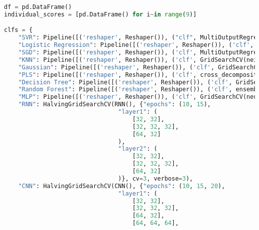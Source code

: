 \begin{lstlisting}[label=python-listing,caption={Kod źródłowy},language=python]
df = pd.DataFrame()
individual_scores = [pd.DataFrame() for i~in range(9)]

clfs = {
    "SVR": Pipeline([('reshaper', Reshaper()), ("clf", MultiOutputRegressor(GridSearchCV(svm.SVR(), {"kernel": ('linear', 'poly', 'rbf', 'sigmoid'), "C": (0.1, 1., 10), "epsilon": (0.01, 0.1, 1)})))]),
    "Logistic Regression": Pipeline([('reshaper', Reshaper()), ('clf', MultiOutputRegressor(GridSearchCV(linear_model.Ridge(), {"solver": ('svd', 'cholesky', 'lsqr', 'sparse_cg', 'sag', 'saga', 'lbfgs')})))]),
    "SGD": Pipeline([('reshaper', Reshaper()), ('clf', MultiOutputRegressor(GridSearchCV(linear_model.SGDRegressor(), {"penalty": ('l2', 'l1', 'elasticnet'), "loss": ('squared_error', 'huber', 'epsilon_insensitive', 'squared_epsilon_insensitive')})))]),
    "KNN": Pipeline([('reshaper', Reshaper()), ('clf', GridSearchCV(neighbors.KNeighborsRegressor(), {"weights": ("unifor", "distance"), "algorithm": ('ball_tree', 'kd_tree', 'brute'), "p": (1, 2, 3, 4)}))]),
    "Gaussian": Pipeline([('reshaper', Reshaper()), ('clf', GridSearchCV(gaussian_process.GaussianProcessRegressor(normalize_y=True), {"alpha": (1e-10, 1e-5, .01, .1), "n_restarts_optimizer": (0, 1, 2, 3, 4)}))]),
    "PLS": Pipeline([('reshaper', Reshaper()), ('clf', cross_decomposition.PLSRegression())]),
    "Decision Tree": Pipeline([('reshaper', Reshaper()), ('clf', GridSearchCV(tree.DecisionTreeRegressor(), {"splitter": ("best", "random"), "min_samples_leaf": (1, 2, 3, 4), "max_depth": (None, 5, 10, 15, 20)}))]),
    "Random Forest": Pipeline([('reshaper', Reshaper()), ('clf', ensemble.RandomForestRegressor())]),
    "MLP": Pipeline([('reshaper', Reshaper()), ('clf', GridSearchCV(neural_network.MLPRegressor(), {'activation': ('identity', 'logistic', 'tanh', 'relu'), "solver": ('lbfgs', 'sgd', 'adam')}))]),
    "RNN": HalvingGridSearchCV(RNN(), {"epochs": (10, 15), 
                                "layer1": (
                                    [32, 32],
                                    [32, 32, 32],
                                    [64, 32]
                                ), 
                                "layer2": (
                                    [32, 32],
                                    [32, 32, 32],
                                    [64, 32]
                                )}, cv=3, verbose=3),
    "CNN": HalvingGridSearchCV(CNN(), {"epochs": (10, 15, 20), 
                                "layer1": (
                                    [32, 32],
                                    [32, 32, 32],
                                    [64, 32],
                                    [64, 64, 64],

\end{lstlisting}
